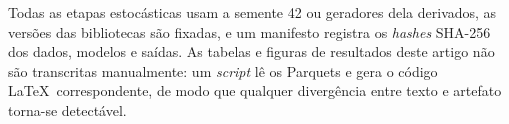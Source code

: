 Todas as etapas estocásticas usam a semente 42 ou geradores dela derivados, as versões das bibliotecas são fixadas, e um manifesto registra os \textit{hashes} SHA-256 dos dados, modelos e saídas. As tabelas e figuras de resultados deste artigo não são transcritas manualmente: um \textit{script} lê os Parquets e gera o código \LaTeX\ correspondente, de modo que qualquer divergência entre texto e artefato torna-se detectável.
